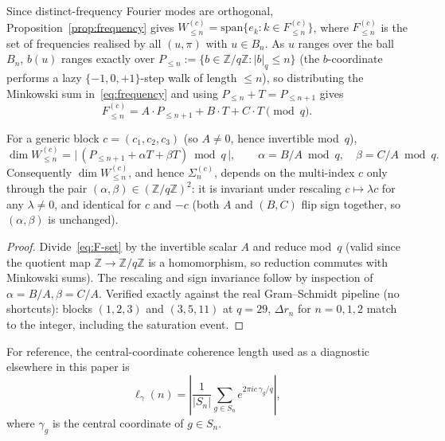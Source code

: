     Since distinct-frequency Fourier modes are orthogonal, Proposition~\ref{prop:frequency}
    gives $W_{\leq n}^{(c)}=\mathrm{span}\{e_k : k\in F_{\leq n}^{(c)}\}$, where
    $F_{\leq n}^{(c)}$ is the set of frequencies realised by all $(u,\pi)$ with $u\in B_n$.
    As $u$ ranges over the ball $B_n$, $b(u)$ ranges exactly over
    $P_{\leq n}:=\{b\in\mathbb{Z}/q\mathbb{Z} : |b|_q\leq n\}$ (the $b$-coordinate performs a
    lazy $\{-1,0,+1\}$-step walk of length $\leq n$), so distributing the Minkowski sum
    in~\eqref{eq:frequency} and using $P_{\leq n}+T=P_{\leq n+1}$ gives
    \begin{equation}
      F_{\leq n}^{(c)} = A\cdot P_{\leq n+1} + B\cdot T + C\cdot T \pmod q.
      \label{eq:F-set}
    \end{equation}

    \begin{proposition}
      \label{prop:alpha-beta}
      For a generic block $c=(c_1,c_2,c_3)$ (so $A\neq 0$, hence invertible mod~$q$),
      \begin{equation}
        \dim W_{\leq n}^{(c)} = \bigl|\,(P_{\leq n+1} + \alpha T + \beta T) \bmod q\,\bigr|,
        \qquad \alpha=B/A \bmod q,\quad \beta=C/A \bmod q.
        \label{eq:alpha-beta-rank}
      \end{equation}
      Consequently $\dim W_{\leq n}^{(c)}$, and hence $\Sigma_n^{(c)}$, depends on the
      multi-index $c$ only through the pair $(\alpha,\beta)\in(\mathbb{Z}/q\mathbb{Z})^2$: it is
      invariant under rescaling $c\mapsto\lambda c$ for any $\lambda\neq 0$, and identical for
      $c$ and $-c$ (both $A$ and $(B,C)$ flip sign together, so $(\alpha,\beta)$ is unchanged).
    \end{proposition}

    \begin{proof}
      Divide~\eqref{eq:F-set} by the invertible scalar $A$ and reduce mod~$q$ (valid since
      the quotient map $\mathbb{Z}\to\mathbb{Z}/q\mathbb{Z}$ is a homomorphism, so reduction
      commutes with Minkowski sums).
      The rescaling and sign invariance follow by inspection of $\alpha=B/A,\beta=C/A$.
      Verified exactly against the real Gram--Schmidt pipeline (no shortcuts): blocks
      $(1,2,3)$ and $(3,5,11)$ at $q=29$, $\Delta r_n$ for $n=0,1,2$ match to the integer,
      including the saturation event.
    \end{proof}

    For reference, the central-coordinate coherence length used as a diagnostic elsewhere in
    this paper is
    \begin{equation}
      \ell_\gamma(n) = \left|\frac{1}{|S_n|}\sum_{g\in S_n} e^{2\pi i c\,\gamma_g/q}\right|,
      \label{eq:coherence}
    \end{equation}
    where $\gamma_g$ is the central coordinate of $g\in S_n$.


